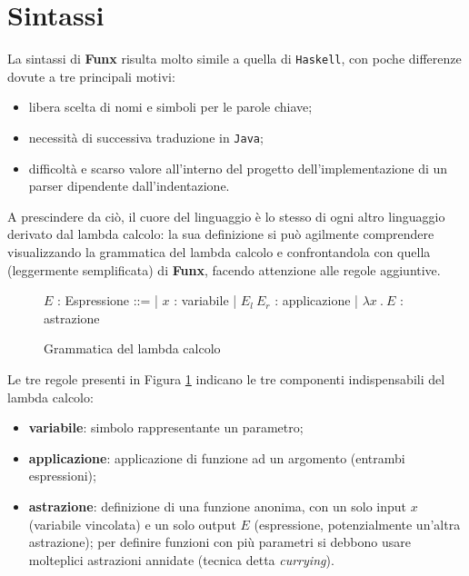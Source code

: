 \section{Sintassi}
\label{sec:2-3-syntax}

La sintassi di \textbf{Funx} risulta molto simile a quella di \texttt{Haskell}, con poche differenze dovute
a tre principali motivi:
\begin{itemize}
    \item libera scelta di nomi e simboli per le parole chiave;
    \item necessità di successiva traduzione in \texttt{Java};
    \item difficoltà e scarso valore all'interno del progetto dell'implementazione di un parser dipendente dall'indentazione.
\end{itemize}

\noindent A prescindere da ciò, il cuore del linguaggio è lo stesso di ogni altro linguaggio derivato dal lambda calcolo:
la sua definizione si può agilmente comprendere visualizzando la grammatica del lambda calcolo e confrontandola con
quella (leggermente semplificata) di \textbf{Funx}, facendo attenzione alle regole aggiuntive.

\begin{figure}[H]
    \centering
    \vspace{4mm}
    \begin{spacedbnf}
        $E$ : \small{Espressione} ::=
        | $x$ : \small{variabile}
        | $E_l\ E_r$ : \small{applicazione}
        | $\lambda x\ .\ E$ : \small{astrazione}
    \end{spacedbnf}
    \caption{Grammatica del lambda calcolo}
    \label{fig:2-lambda-syntax}
    \vspace{4mm}
\end{figure}

\noindent Le tre regole presenti in Figura \ref{fig:2-lambda-syntax} indicano le tre componenti indispensabili
del lambda calcolo:
\begin{itemize}
    \item \textbf{variabile}: simbolo rappresentante un parametro;
    \item \textbf{applicazione}: applicazione di funzione ad un argomento (entrambi espressioni);
    \item \textbf{astrazione}: definizione di una funzione anonima, con un solo input $x$ (variabile vincolata)
          e un solo output $E$ (espressione, potenzialmente un'altra astrazione); per definire funzioni con più
          parametri si debbono usare molteplici astrazioni annidate (tecnica detta \textit{currying}).
\end{itemize}

